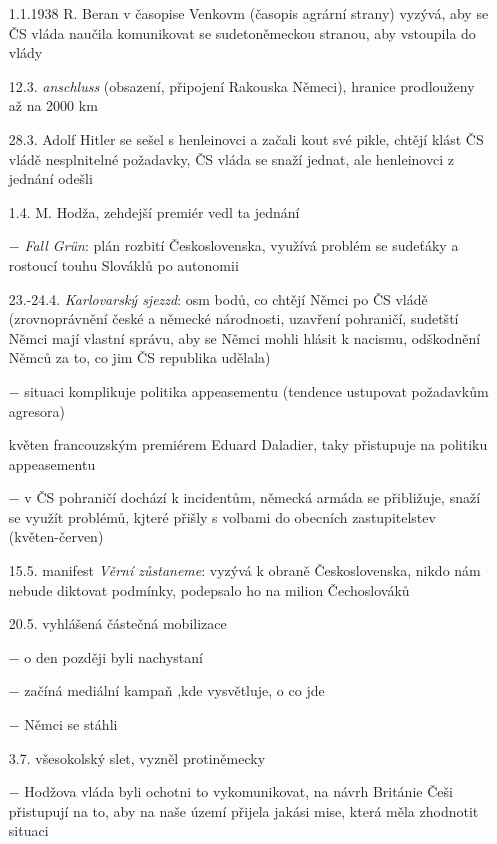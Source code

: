 \documentclass{article}
\begin{document}
\begin{itemize}
    \vspace{-0.5em}
    \setlength\itemsep{0.15em}
    \item[1.1.1938] R. Beran v časopise Venkovm (časopis agrární strany) vyzývá, aby se ČS vláda naučila komunikovat se sudetoněmeckou stranou, aby vstoupila do vlády
    \item[12.3.] \textit{anschluss} (obsazení, připojení Rakouska Němeci), hranice prodlouženy až na 2000 km
    \item[28.3.] Adolf Hitler se sešel s henleinovci a začali kout své pikle, chtějí klást ČS vládě nesplnitelné požadavky, ČS vláda se snaží jednat, ale henleinovci z jednání odešli
    \item[1.4.] M. Hodža, zehdejší premiér vedl ta jednání
    \item[$-$] \textit{Fall Grün}: plán rozbití Československa, využívá problém se sudeťáky a rostoucí touhu Slováklů po autonomii
    \item[23.-24.4.] \textit{Karlovarský sjezzd}: osm bodů, co chtějí Němci po ČS vládě (zrovnoprávnění české a německé národnosti, uzavření pohraničí, sudetští Němci mají vlastní správu, aby se Němci mohli hlásit k nacismu, odškodnění Němců za to, co jim ČS republika udělala)
    \item[$-$] situaci komplikuje politika appeasementu (tendence ustupovat požadavkům agresora)
    \item[květen] francouzským premiérem Eduard Daladier, taky přistupuje na politiku appeasementu
    \item[$-$] v ČS pohraničí dochází k incidentům, německá armáda se přibližuje, snaží se využít problémů, kjteré přišly s volbami do obecních zastupitelstev (květen-červen)
    \item[15.5.] manifest \textit{Věrní zůstaneme}: vyzývá k obraně Československa, nikdo nám nebude diktovat podmínky, podepsalo ho na milion Čechoslováků
    \item[20.5.] vyhlášená částečná mobilizace
    \item[$-$] o den později byli nachystaní
    \item[$-$] začíná mediální kampaň ,kde vysvětluje, o co jde
    \item[$-$] Němci se stáhli
    \item[3.7.] všesokolský slet, vyzněl protiněmecky
    \item[$-$] Hodžova vláda byli ochotni to vykomunikovat, na návrh Británie Češi přistupují na to, aby na naše území přijela jakási mise, která měla zhodnotit situaci

\end{itemize}
\end{document}
